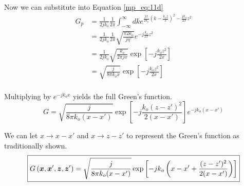 Now we can substitute into Equation \ref{mp_eq:11d}
\begin{equation}
\begin{aligned}
G_p &= \frac{1}{2jk_o}\frac{1}{2\pi}\int_{-\infty}^{\infty}dk e^{\frac{jx}{2k_o}\left(k  -\frac{k_oz}{x}\right)^2- \frac{jk_o}{2x}z^2 } \\
&= \frac{1}{2jk_o}\frac{1}{2\pi} \sqrt{\frac{\pi 2k_o}{j\eta'}}e^{-j\frac{k_o}{2x}z^2 } \\
&= \frac{1}{2jk_o}\sqrt{\frac{k_o}{2\pi jx}}\exp\left[-j\frac{k_oz^2}{2x} \right]\\
&= \sqrt{\frac{j}{8\pi k_ox}}\exp\left[-j\frac{k_oz^2}{2x} \right]\\
\end{aligned}
\label{mp_eq:11f}
\end{equation}

Multiplying by $e^{-jk_ox}$ yields the full Green's function.
\begin{equation}
G= \sqrt{\frac{j}{8\pi k_o(x-x')}}\exp\left[-j\frac{k_o(z-z')^2}{2(x-x')} \right]e^{-jk_o(x-x')}
\label{mp_eq:11fa}
\end{equation}
 
We can let $x\rightarrow x-x'$ and $x\rightarrow z-z'$ to represent the Green's function as traditionally shown.
\begin{equation}
\boxed{G\left(\boldsymbol{x},\boldsymbol{x}',\boldsymbol{z},\boldsymbol{z}' \right)= \sqrt{\frac{j}{8\pi k_o(x-x')}}\exp\left[-jk_o\left(x-x' + \frac{(z-z')^2}{2(x-x')}\right) \right]}\\
\label{mp_eq:11fb}
\end{equation}
